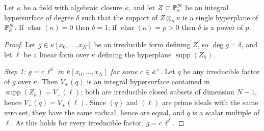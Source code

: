 \begin{lemma}\label{lemma:geometric_hyperplane_p_power_r2}
    Let $\kappa$ be a field with algebraic closure $\bar{\kappa}$, and let
    $Z \subset \mathbb{P}^N_\kappa$ be an integral hypersurface of degree $\delta$ such that the
    support of $Z \otimes_\kappa \bar{\kappa}$ is a single hyperplane of $\mathbb{P}^N_{\bar\kappa}$.
    If $\operatorname{char}(\kappa) = 0$ then $\delta = 1$; if $\operatorname{char}(\kappa) = p > 0$
    then $\delta$ is a power of $p$.
\end{lemma}
\begin{proof}
    Let $g \in \kappa[x_0, \dots, x_N]$ be an irreducible form defining $Z$, so
    $\deg g = \delta$, and let $\ell$ be a linear form over $\bar{\kappa}$ defining the
    hyperplane $\operatorname{supp}(Z_{\bar\kappa})$.

    \emph{Step 1: $g = c\,\ell^{\delta}$ in $\bar{\kappa}[x_0, \dots, x_N]$ for some
    $c \in \bar{\kappa}^\times$.}
    Let $q$ be any irreducible factor of $g$ over $\bar{\kappa}$. Then $V_+(q)$ is an integral
    hypersurface contained in $\operatorname{supp}(Z_{\bar\kappa}) = V_+(\ell)$; both are
    irreducible closed subsets of dimension $N-1$, hence $V_+(q) = V_+(\ell)$. Since $(q)$ and
    $(\ell)$ are prime ideals with the same zero set, they have the same radical, hence are
    equal, and $q$ is a scalar multiple of $\ell$. As this holds for every irreducible factor,
    $g = c\,\ell^{\delta}$.


\end{proof}
